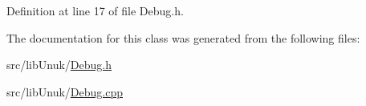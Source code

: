 Definition at line 17 of file Debug.h.



The documentation for this class was generated from the following files:\begin{DoxyCompactItemize}
\item 
src/libUnuk/\hyperlink{_debug_8h}{Debug.h}\item 
src/libUnuk/\hyperlink{_debug_8cpp}{Debug.cpp}\end{DoxyCompactItemize}

